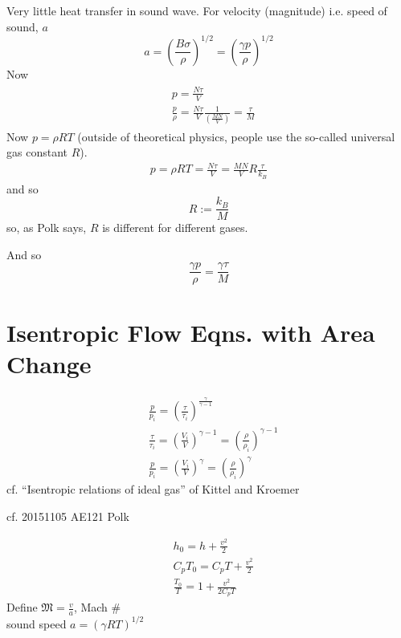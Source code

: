 \documentclass[10pt]{amsart}
\begin{document}
\begin{multicols*}{2}
Very little heat transfer in sound wave.  For velocity (magnitude) i.e. speed of sound, $a$
\[
a = \left( \frac{ B \sigma }{ \rho } \right)^{1/2} = \left( \frac{ \gamma p }{ \rho } \right)^{1/2}
\]
Now
\[
\begin{gathered}
  \begin{aligned}
    & p = \frac{N\tau }{V} \\ 
    & \frac{p}{\rho} = \frac{N\tau}{V} \frac{1}{ \left( \frac{MN}{V} \right) } = \frac{\tau}{M}
\end{aligned}
\end{gathered}
\]
Now $p = \rho RT$ (outside of theoretical physics, people use the so-called universal gas constant $R$).  
\[
\begin{gathered}
  p = \rho R T = \frac{N\tau}{V} = \frac{MN}{V} R \frac{\tau}{k_B}
\end{gathered}
\]
and so 
\begin{equation}
  R := \frac{k_B}{M}
\end{equation}
so, as Polk says, $R$ is different for different gases.  

And so
\[
\frac{ \gamma p }{ \rho } = \frac{ \gamma \tau }{M}
\]


\section{Isentropic Flow Eqns. with Area Change}

\[
\begin{aligned}
  & \frac{p}{p_i} = \left( \frac{\tau}{\tau_i} \right)^{\frac{\gamma}{\gamma -1} } \\ 
  & \frac{\tau}{\tau_i} = \left( \frac{V_i}{V} \right)^{\gamma -1}  = \left( \frac{\rho}{\rho_i} \right)^{\gamma - 1 }   \\
  & \frac{p}{p_i} = \left( \frac{V_i}{V} \right)^{\gamma} = \left( \frac{\rho}{ \rho_i} \right)^{\gamma}
\end{aligned}
\]
cf. ``Isentropic relations of ideal gas''  of Kittel and Kroemer \cite{CKittelHKroemer1980}

cf. 20151105 AE121 Polk

\[
\begin{aligned}
  & h_0 = h + \frac{v^2}{2} \\ 
  & C_p T_0 = C_p T + \frac{v^2}{2} \\ 
  & \frac{T_0}{T} = 1 + \frac{v^2}{2C_p T}
\end{aligned}
\]
Define $\mathfrak{M} = \frac{v}{a}$, Mach $\#$ \\
\phantom{\quad \, } sound speed $a = (\gamma RT)^{1/2}$


\end{multicols*}
\end{document}
